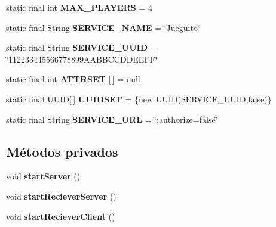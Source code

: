 \begin{DoxyCompactItemize}
\item 
\hypertarget{classBatallaEspacial_1_1Broadcaster_a495f0b2bcfa16f3fb09e34c0ffd4cefa}{
static final int {\bfseries MAX\_\-PLAYERS} = 4}
\label{classBatallaEspacial_1_1Broadcaster_a495f0b2bcfa16f3fb09e34c0ffd4cefa}

\item 
\hypertarget{classBatallaEspacial_1_1Broadcaster_a27a2549bf4ae0dae889124b83d0bfc39}{
static final String {\bfseries SERVICE\_\-NAME} = \char`\"{}Jueguito\char`\"{}}
\label{classBatallaEspacial_1_1Broadcaster_a27a2549bf4ae0dae889124b83d0bfc39}

\item 
\hypertarget{classBatallaEspacial_1_1Broadcaster_af6c708c17f0af280895fa6753599866d}{
static final String {\bfseries SERVICE\_\-UUID} = \char`\"{}112233445566778899AABBCCDDEEFF\char`\"{}}
\label{classBatallaEspacial_1_1Broadcaster_af6c708c17f0af280895fa6753599866d}

\item 
\hypertarget{classBatallaEspacial_1_1Broadcaster_a19f908b9c3dc6befb220365711677a70}{
static final int {\bfseries ATTRSET} \mbox{[}$\,$\mbox{]} = null}
\label{classBatallaEspacial_1_1Broadcaster_a19f908b9c3dc6befb220365711677a70}

\item 
\hypertarget{classBatallaEspacial_1_1Broadcaster_aee2bbe25013335d0d276c4a14f8b2197}{
static final UUID\mbox{[}$\,$\mbox{]} {\bfseries UUIDSET} = \{new UUID(SERVICE\_\-UUID,false)\}}
\label{classBatallaEspacial_1_1Broadcaster_aee2bbe25013335d0d276c4a14f8b2197}

\item 
\hypertarget{classBatallaEspacial_1_1Broadcaster_a7b2929c761447e3b6baa63bc938843e6}{
static final String {\bfseries SERVICE\_\-URL} = \char`\"{};authorize=false\char`\"{}}
\label{classBatallaEspacial_1_1Broadcaster_a7b2929c761447e3b6baa63bc938843e6}

\end{DoxyCompactItemize}
\subsection*{Métodos privados}
\begin{DoxyCompactItemize}
\item 
\hypertarget{classBatallaEspacial_1_1Broadcaster_a2bae6d97069109f933ae5bd9ef1f11f6}{
void {\bfseries startServer} ()}
\label{classBatallaEspacial_1_1Broadcaster_a2bae6d97069109f933ae5bd9ef1f11f6}

\item 
\hypertarget{classBatallaEspacial_1_1Broadcaster_a2742f0b1d35b9397865a917303c379ed}{
void {\bfseries startRecieverServer} ()}
\label{classBatallaEspacial_1_1Broadcaster_a2742f0b1d35b9397865a917303c379ed}

\item 
\hypertarget{classBatallaEspacial_1_1Broadcaster_abb252cfa330aa39e29213f676017e0de}{
void {\bfseries startRecieverClient} ()}
\label{classBatallaEspacial_1_1Broadcaster_abb252cfa330aa39e29213f676017e0de}

\end{DoxyCompactItemize}

